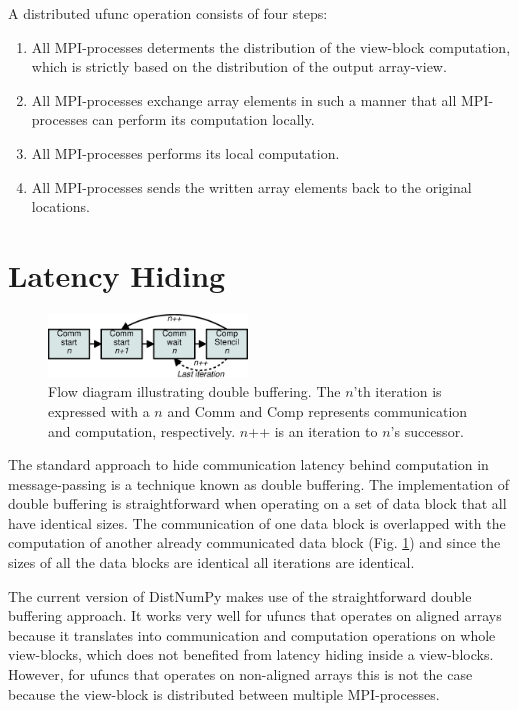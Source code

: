 \documentclass[preprint]{../PGAS10/sigplanconf}
\begin{document}
A distributed ufunc operation consists of four steps:
\begin{enumerate}
\item All MPI-processes determents the distribution of the view-block computation, which is strictly based on the distribution of the output array-view.
\item All MPI-processes exchange array elements in such a manner that all MPI-processes can perform its computation locally. 
\item All MPI-processes performs its local computation.
\item All MPI-processes sends the written array elements back to the original locations.
\end{enumerate}



\section{Latency Hiding}
\begin{figure}
 \centering
 \includegraphics[width=200px]{gfx/double_buffering}
 \caption{Flow diagram illustrating double buffering. The $n$'th iteration is expressed with a $n$ and Comm and Comp represents communication and computation, respectively. $n$++ is an iteration to $n$'s successor.}
 \label{fig:double_buffering}
\end{figure}

The standard approach to hide communication latency behind computation in message-passing is a technique known as double buffering. The implementation of double buffering is straightforward when operating on a set of data block that all have identical sizes. The communication of one data block is overlapped with the computation of another already communicated data block (Fig. \ref{fig:double_buffering}) and since the sizes of all the data blocks are identical all iterations are identical.

The current version of DistNumPy makes use of the straightforward double buffering approach. It works very well for ufuncs that operates on aligned arrays because it translates into communication and computation operations on whole view-blocks, which does not benefited from latency hiding inside a view-blocks. However, for ufuncs that operates on non-aligned arrays this is not the case because the view-block is distributed between multiple MPI-processes. 
\end{document}
